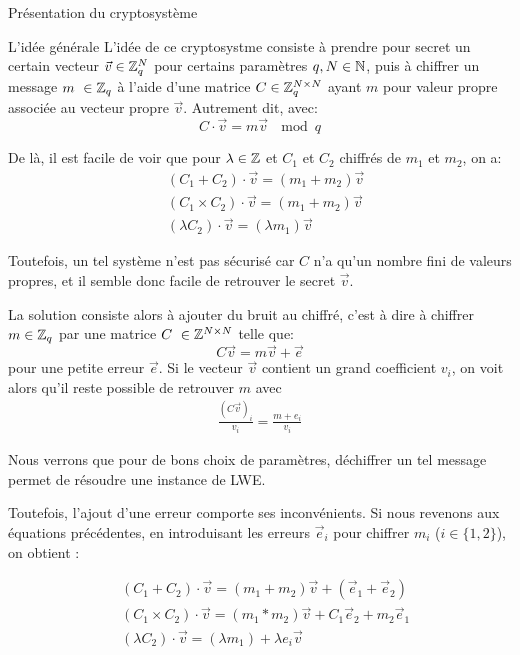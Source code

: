 \begin{section}{Présentation du cryptosystème}
	\begin{subsection}{L'idée générale}
	L'idée de ce cryptosystme consiste à prendre pour secret un
	certain vecteur $\vec{v} \in \mathbb{Z}_q^N$ pour certains paramètres
	$q, N \in \mathbb{N}$, puis à chiffrer un message $m \in \ZZq$ à
	l'aide d'une matrice $C \in \mathbb{Z}_q^{N \times N}$ ayant $m$ pour valeur propre 
	associée au vecteur propre $\vec{v}$. Autrement dit, avec:
	\[C \cdot \vec{v} = m \vec{v}\: \mod q \]

	De là, il est facile de voir que pour $\lambda \in \mathbb{Z}$ et  $C_1$ et $C_2$ 
	chiffrés de $m_1$ et $m_2$, on a:
	\begin{align*}
	& (C_1 + C_2) \cdot \vec{v} = (m_1 + m_2) \vec{v} \\
	& (C_1 \times C_2) \cdot \vec{v} = (m_1 + m_2) \vec{v} \\
	& (\lambda  C_2) \cdot \vec{v} = (\lambda m_1) \vec{v} 
	\end{align*}

	Toutefois, un tel système n'est pas sécurisé car $C$ n'a qu'un nombre
	fini de valeurs propres, et il semble donc facile de 
	retrouver le secret $\vec{v}$.

	La solution consiste alors à ajouter du bruit au chiffré, c'est à dire
	à chiffrer $m\in \ZZq$ par une matrice $C \in \ZZ^{N \times N}$
	telle que:
	\[ C \vec{v} = m \vec{v} + \vec{e} \]
	pour une \og petite \fg erreur $\vec{e}$. Si le vecteur
	$\vec{v}$ contient un grand coefficient $v_i$, on voit alors qu'il 
	reste possible de retrouver $m$ avec
	\begin{align*}
	\frac{{(C \vec{v})}_i}{v_i} = \frac{m + e_i}{v_i}
	\end{align*}
	
		Nous verrons que pour de bons
	choix de paramètres, déchiffrer un tel message permet de
	résoudre une instance de LWE.

	Toutefois, l'ajout d'une erreur comporte ses inconvénients. Si nous
	revenons aux équations précédentes, en introduisant les erreurs 
	$\vec{e}_i$ pour chiffrer  $m_i$ ($i\in \{1,2\}$), on obtient :

	\begin{align*}
	& (C_1 + C_2) \cdot \vec{v} = (m_1 + m_2) \vec{v} + (\vec{e}_1 + \vec{e}_2)\\
		& (C_1 \times C_2) \cdot \vec{v} = (m_1 * m_2) \vec{v} + C_1
		\vec{e}_2 + m_2\vec{e}_1 \\
	& (\lambda  C_2) \cdot \vec{v} = (\lambda m_1) + \lambda e_i\vec{v} 
	\end{align*}


\end{subsection}
\end{section}
